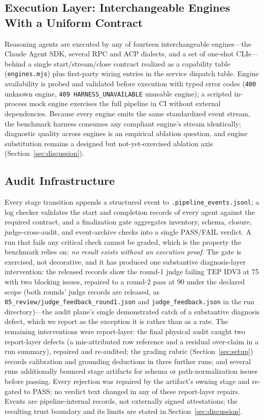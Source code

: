 \documentclass[preprint,12pt]{elsarticle}
\begin{document}
\subsection{Execution Layer: Interchangeable Engines With a Uniform Contract}
Reasoning agents are executed by any of fourteen interchangeable engines---the Claude Agent SDK, several RPC and ACP dialects, and a set of one-shot CLIs---behind a single start/stream/close contract realized as a capability table (\texttt{engines.mjs}) plus first-party wiring entries in the service dispatch table. Engine availability is probed and validated before execution with typed error codes (\texttt{400} unknown engine, \texttt{409 HARNESS\_UNAVAILABLE} unusable engine); a scripted in-process mock engine exercises the full pipeline in CI without external dependencies. Because every engine emits the same standardized event stream, the benchmark harness consumes any compliant engine's stream identically; diagnostic quality across engines is an empirical ablation question, and engine substitution remains a designed but not-yet-exercised ablation axis (Section~\ref{sec:discussion}).

\subsection{Audit Infrastructure}
Every stage transition appends a structured event to \texttt{.pipeline\_\allowbreak events.\allowbreak jsonl}; a log checker validates the start and completion records of every agent against the required contract, and a finalization gate aggregates inventory, schema, closure, judge-cross-audit, and event-archive checks into a single PASS/FAIL verdict. A run that fails any critical check cannot be graded, which is the property the benchmark relies on: \emph{no result exists without an execution proof}. The gate is exercised, not decorative, and it has produced one substantive diagnosis-layer intervention: the released records show the round-1 judge failing TEP IDV3 at 75 with two blocking issues, repaired to a round-2 pass at 90 under the declared scope (both rounds' judge records are released, as \texttt{05\_review/judge\_feedback\_round1.json} and \texttt{judge\_feedback.json} in the run directory)---the audit plane's single demonstrated catch of a substantive diagnosis defect, which we report as the exception it is rather than as a rate. The remaining interventions were report-layer: the final physical audit caught two report-layer defects (a mis-attributed row reference and a residual over-claim in a run summary), repaired and re-audited; the grading rubric (Section~\ref{sec:setup}) records calibration and grounding deductions in three further runs; and several runs additionally bounced stage artifacts for schema or path-normalization issues before passing. Every rejection was repaired by the artifact's owning stage and re-gated to PASS; no verdict text changed in any of these report-layer repairs. Events are pipeline-internal records, not externally signed attestations; the resulting trust boundary and its limits are stated in Section~\ref{sec:discussion}.
\end{document}
